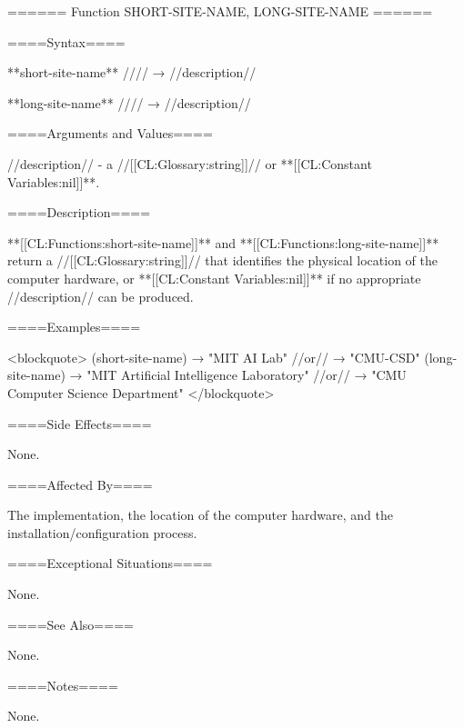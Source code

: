 ====== Function SHORT-SITE-NAME, LONG-SITE-NAME ======

====Syntax====

**short-site-name** //\noargs// → //description//

**long-site-name** //\noargs// → //description//

====Arguments and Values====

//description// - a //[[CL:Glossary:string]]// or **[[CL:Constant Variables:nil]]**.

====Description====

**[[CL:Functions:short-site-name]]** and **[[CL:Functions:long-site-name]]** return a //[[CL:Glossary:string]]// that identifies the physical location of the computer hardware, or **[[CL:Constant Variables:nil]]** if no appropriate //description// can be produced.

====Examples====

<blockquote> (short-site-name) → "MIT AI Lab" //or// → "CMU-CSD" (long-site-name) → "MIT Artificial Intelligence Laboratory" //or// → "CMU Computer Science Department" </blockquote>

====Side Effects====

None.

====Affected By====

The implementation, the location of the computer hardware, and the installation/configuration process.

====Exceptional Situations====

None.

====See Also====

None.

====Notes====

None.

